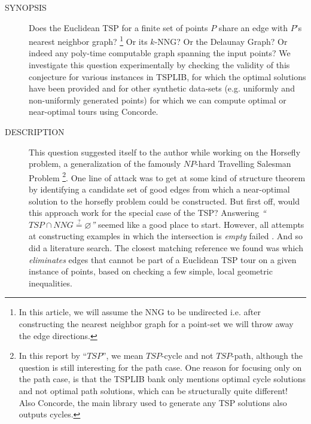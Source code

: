 \vspace{5mm}
\begin{description}
  \item[SYNOPSIS] Does the Euclidean TSP for a finite set of points $P$ share an edge with $P$'s nearest neighbor graph? \footnote{In this article, we will assume the NNG to be undirected i.e. after constructing the nearest neighbor graph for a point-set we will throw away the edge directions.}
     Or its $k$-NNG? Or the Delaunay Graph? 
     Or indeed any poly-time computable graph spanning the input points? We investigate
     this question experimentally by checking the validity of this conjecture for  
     various instances  in TSPLIB, for which the optimal solutions
     have been provided and for other synthetic data-sets (e.g. uniformly and non-uniformly generated points)
     for which we can compute optimal or near-optimal tours using Concorde. 
                   
  \item[DESCRIPTION] This question suggested itself to the author while working on the Horsefly problem, 
     a generalization of the famously $NP$-hard Travelling Salesman Problem \footnote{In this report by ``$TSP$'', we mean $TSP$-cycle and not $TSP$-path, although the question is still interesting for the path case. One reason for focusing only on the path case, is that the TSPLIB bank only mentions optimal cycle solutions and not optimal path solutions, which can be structurally quite different! Also Concorde, the main library used to generate any TSP solutions also outputs cycles.}. 
     One line of attack was to get at some kind of structure theorem by identifying  a candidate set of good edges from which a near-optimal solution to the 
     horsefly problem could be constructed. But first off, would this approach work for the special case of the  TSP?  Answering
     \textit{``$TSP \cap NNG \stackrel{?}{=} \varnothing$''} seemed like a good place to start.  However, all attempts  
     at constructing examples in which the intersection is \textit{empty} failed . And so did a
     literature search. The closest matching reference we found was \cite{hougardy2014edge} which \textit{eliminates} edges 
     that cannot be part of a Euclidean TSP tour on a given instance of points, based on checking a few simple, local geometric inequalities. 


\end{description}
